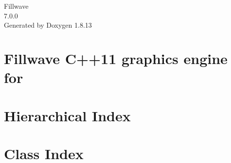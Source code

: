 \documentclass[twoside]{book}
\newcommand{\+}{\discretionary{\mbox{\scriptsize$\hookleftarrow$}}{}{}}
\newcommand{\clearemptydoublepage}{%
  \newpage{\pagestyle{empty}\cleardoublepage}%
}
\begin{document}
\hypersetup{pageanchor=false,
             bookmarksnumbered=true,
             pdfencoding=unicode
            }
\begin{titlepage}
\vspace*{7cm}
\begin{center}%
{\Large Fillwave \\[1ex]\large 7.\+0.\+0 }\\
\vspace*{1cm}
{\large Generated by Doxygen 1.8.13}\\
\end{center}
\end{titlepage}
\clearemptydoublepage
{}
\tableofcontents
\clearemptydoublepage
{}
\hypersetup{pageanchor=true}

\chapter{Fillwave C++11 graphics engine for}
\label{index}\hypertarget{index}{}
\chapter{Hierarchical Index}

\chapter{Class Index}

\end{document}
